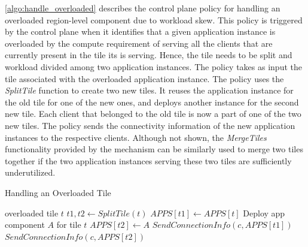 \cref{algo:handle_overloaded} describes the control plane policy for handling an overloaded region-level component due to workload skew. This policy is triggered by the control plane when it identifies that a given application instance is overloaded by the compute requirement of serving all the clients that are currently present in the tile its is serving. Hence, the tile needs to be split and workload divided among two application instances. The policy takes as input the tile associated with the overloaded application instance. The policy uses the \textit{SplitTile} function to create two new tiles. It reuses the application instance for the old tile for one of the new ones, and deploys another instance for the second new tile. Each client that belonged to the old tile is now a part of one of the two new tiles. The policy sends the connectivity information of the new application instances to the respective clients. Although not shown, the \textit{MergeTiles} functionality provided by the mechanism can be similarly used to merge two tiles together if the two application instances serving these two tiles are sufficiently underutilized.
\begin{algorithm}
\caption{Handling an Overloaded Tile}
\begin{algorithmic}
\Require overloaded tile $t$
\State $t1, t2 \gets SplitTile \left( t \right)$
\State $APPS \left[ t1 \right] \gets APPS \left[ t \right]$
\State Deploy app component $A$ for tile $t$
\State $APPS  \left[ t2 \right] \gets A$
    \State $SendConnectionInfo \left(c, APPS \left[ t1 \right] \right)$
\EndFor
{}
    \State $SendConnectionInfo \left(c, APPS \left[ t2 \right] \right)$
\EndFor
\end{algorithmic}
\label{algo:handle_overloaded}
\end{algorithm}

